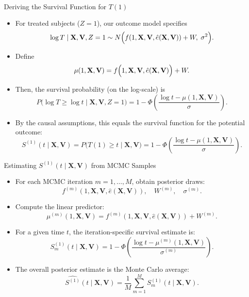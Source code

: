 \begin{frame}{Deriving the Survival Function for \(T(1)\)}
  \begin{itemize}
    \item For treated subjects (\(Z=1\)), our outcome model specifies
      \[
      \log T \mid \mathbf{X},\mathbf{V},Z=1 \sim N\Bigl(f(1,\mathbf{X},\mathbf{V},\hat{e}(\mathbf{X},\mathbf{V})) + W,\; \sigma^2\Bigr).
      \]
    \item Define
      \[
      \mu(1,\mathbf{X},\mathbf{V}) = f\Bigl(1,\mathbf{X},\mathbf{V},\hat{e}(\mathbf{X},\mathbf{V})\Bigr) + W.
      \]
    \item Then, the survival probability (on the log-scale) is
      \[
      P\bigl(\log T \ge \log t \mid \mathbf{X},\mathbf{V},Z=1\bigr) = 1 - \Phi\!\left(\frac{\log t - \mu(1,\mathbf{X},\mathbf{V})}{\sigma}\right).
      \]
    \item By the causal assumptions, this equals the survival function for the potential outcome:
      \[
      S^{(1)}(t\mid \mathbf{X},\mathbf{V}) = P\bigl(T(1) \ge t \mid \mathbf{X},\mathbf{V}\bigr) = 1 - \Phi\!\left(\frac{\log t - \mu(1,\mathbf{X},\mathbf{V})}{\sigma}\right).
      \]
  \end{itemize}
\end{frame}

\begin{frame}{Estimating \(S^{(1)}(t\mid \mathbf{X},\mathbf{V})\) from MCMC Samples}
  \begin{itemize}
    \item For each MCMC iteration \(m = 1,\ldots, M\), obtain posterior draws:
      \[
      f^{(m)}(1,\mathbf{X},\mathbf{V},\hat{e}(\mathbf{X},\mathbf{V})), \quad W^{(m)}, \quad \sigma^{(m)}.
      \]
    \item Compute the linear predictor:
      \[
      \mu^{(m)}(1,\mathbf{X},\mathbf{V}) = f^{(m)}(1,\mathbf{X},\mathbf{V},\hat{e}(\mathbf{X},\mathbf{V})) + W^{(m)}.
      \]
    \item For a given time \(t\), the iteration-specific survival estimate is:
      \[
      S^{(1)}_m(t\mid \mathbf{X},\mathbf{V}) = 1 - \Phi\!\left(\frac{\log t - \mu^{(m)}(1,\mathbf{X},\mathbf{V})}{\sigma^{(m)}}\right).
      \]
    \item The overall posterior estimate is the Monte Carlo average:
      \[
      \widehat{S^{(1)}}(t\mid \mathbf{X},\mathbf{V}) = \frac{1}{M}\sum_{m=1}^M S^{(1)}_m(t\mid \mathbf{X},\mathbf{V}).
      \]
    \end{itemize}
\end{frame}


